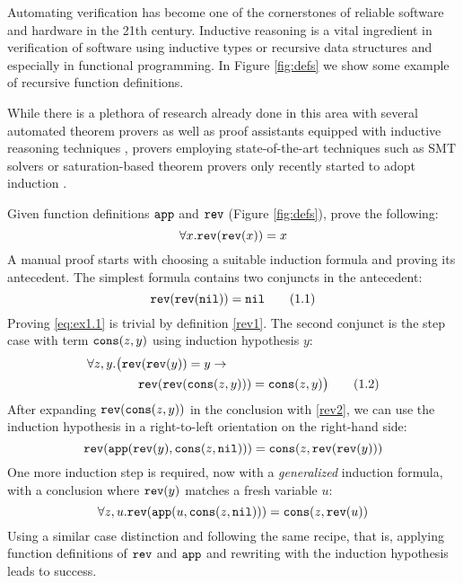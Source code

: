 Automating verification has become one of the cornerstones of reliable software and hardware in the 21th century. Inductive reasoning is a vital ingredient in verification of software using inductive types or recursive data structures and especially in functional programming. In Figure \ref{fig:defs} we show some example of recursive function definitions.

While there is a plethora of research already done in this area \cite{bundychapter,mooreindutionhistory} with several automated theorem provers as well as proof assistants equipped with inductive reasoning techniques \cite{acl,aclhandbook,inka,oyster}, provers employing state-of-the-art techniques such as SMT solvers or saturation-based theorem provers only recently started to adopt induction \cite{cruanes,vampireinduction,smtinduction}. 

\begin{example}\label{ex:1}
Given function definitions $\mathtt{app}$ and $\mathtt{rev}$ (Figure \ref{fig:defs}), prove the following:
$$\forall x. \mathtt{rev}(\mathtt{rev}(x))=x$$
A manual proof starts with choosing a suitable induction formula and proving its antecedent. The simplest formula contains two conjuncts in the antecedent:
\begin{equation}\label{eq:ex1.1}\mathtt{rev}(\mathtt{rev}(\mathtt{nil})) = \mathtt{nil}\tag{1.1}\end{equation}
Proving \eqref{eq:ex1.1} is trivial by definition \eqref{rev1}. The second conjunct is the step case with term $\mathtt{cons}(z,y)$ using induction hypothesis $y$:
\begin{align}\forall z,y.\big(\mathtt{rev}(\mathtt{rev}(y))&=y\rightarrow\nonumber\\\mathtt{rev}(\mathtt{rev}(&\mathtt{cons}(z,y)))=\mathtt{cons}(z,y)\big)\label{eq:ex1.2}\tag{1.2}\end{align}
After expanding $\mathtt{rev}(\mathtt{cons}(z,y))$ in the conclusion with \eqref{rev2}, we can use the induction hypothesis in a right-to-left orientation on the right-hand side:
$$\mathtt{rev}(\mathtt{app}(\mathtt{rev}(y),\mathtt{cons}(z,\mathtt{nil})))=\mathtt{cons}(z,\mathtt{rev}(\mathtt{rev}(y)))$$
One more induction step is required, now with a \textit{generalized} induction formula, with a conclusion where $\mathtt{rev}(y)$ matches a fresh variable $u$:
$$\forall z,u.\mathtt{rev}(\mathtt{app}(u,\mathtt{cons}(z,\mathtt{nil})))=\mathtt{cons}(z,\mathtt{rev}(u))$$
Using a similar case distinction and following the same recipe, that is, applying function definitions of $\mathtt{rev}$ and $\mathtt{app}$ and rewriting with the induction hypothesis leads to success.
\end{example}

